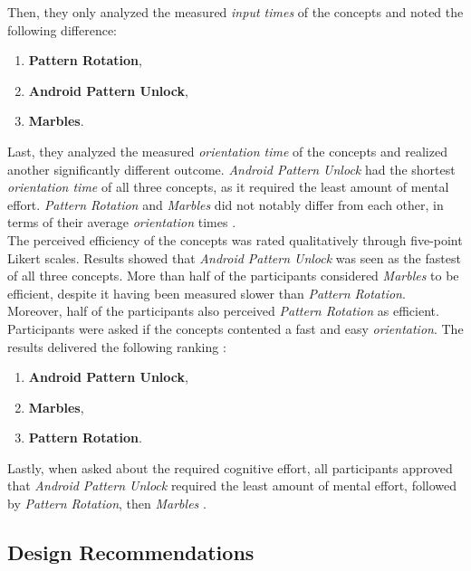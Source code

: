 Then, they only analyzed the measured \textit{input times} of the concepts and noted the following difference:

\begin{enumerate}
    \item \textbf{Pattern Rotation},
    \item \textbf{Android Pattern Unlock},
    \item \textbf{Marbles}.
\end{enumerate}

Last, they analyzed the measured \textit{orientation time} of the concepts and realized another significantly different outcome. \textit{Android Pattern Unlock} had the shortest \textit{orientation time} of all three concepts, as it required the least amount of mental effort. \textit{Pattern Rotation} and \textit{Marbles} did not notably differ from each other, in terms of their average \textit{orientation} times \cite{Zezschwitz}. \\


The perceived efficiency of the concepts was rated qualitatively through five-point Likert scales. Results showed that \textit{Android Pattern Unlock} was seen as the fastest of all three concepts. More than half of the participants considered \textit{Marbles} to be efficient, despite it having been measured slower than \textit{Pattern Rotation}. Moreover, half of the participants also perceived \textit{Pattern Rotation} as efficient. Participants were asked if the concepts contented a fast and easy \textit{orientation}. The results delivered the following ranking \cite{Zezschwitz}: 

\begin{enumerate}
     \item \textbf{Android Pattern Unlock},
    \item \textbf{Marbles},
    \item \textbf{Pattern Rotation}.
\end{enumerate}

Lastly, when asked about the required cognitive effort, all participants approved that \textit{Android Pattern Unlock} required the least amount of mental effort, followed by \textit{Pattern Rotation}, then \textit{Marbles} \cite{Zezschwitz}.

\subsection{Design Recommendations} \label{3.2.2}

